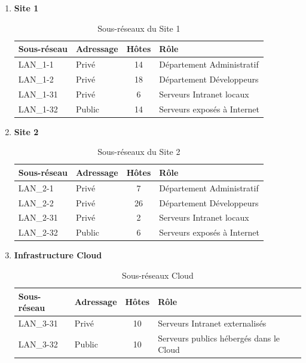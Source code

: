 \documentclass[12pt,a4paper, oneside]{memoir}
\begin{document}
\begin{enumerate}
	\item \textbf{Site 1}

\begin{table}[H]
	\centering
	\renewcommand{\arraystretch}{1.3}
	\begin{tabular}{|l|l|c|l|}
		\hline
		\textbf{Sous-réseau} & \textbf{Adressage} & \textbf{Hôtes} & \textbf{Rôle} \\
		\hline
		LAN\_1-1 & Privé & 14 & Département Administratif \\
		LAN\_1-2 & Privé & 18 & Département Développeurs \\
		LAN\_1-31 & Privé & 6 & Serveurs Intranet locaux \\
		LAN\_1-32 & Public & 14 & Serveurs exposés à Internet \\
		\hline
	\end{tabular}
	\caption{Sous-réseaux du Site 1}
\end{table}

	\item \textbf{Site 2}

\begin{table}[H]
	\centering
	\renewcommand{\arraystretch}{1.3}
	\begin{tabular}{|l|l|c|l|}
		\hline
		\textbf{Sous-réseau} & \textbf{Adressage} & \textbf{Hôtes} & \textbf{Rôle} \\
		\hline
		LAN\_2-1 & Privé & 7 & Département Administratif \\
		LAN\_2-2 & Privé & 26 & Département Développeurs \\
		LAN\_2-31 & Privé & 2 & Serveurs Intranet locaux \\
		LAN\_2-32 & Public & 6 & Serveurs exposés à Internet \\
		\hline
	\end{tabular}
	\caption{Sous-réseaux du Site 2}
\end{table}

	\item \textbf{Infrastructure Cloud}

\begin{table}[H]
	\centering
	\renewcommand{\arraystretch}{1.3}
	\begin{tabular}{|l|l|c|l|}
		\hline
		\textbf{Sous-réseau} & \textbf{Adressage} & \textbf{Hôtes} & \textbf{Rôle} \\
		\hline
		LAN\_3-31 & Privé & 10 & Serveurs Intranet externalisés \\
		LAN\_3-32 & Public & 10 & Serveurs publics hébergés dans le Cloud \\
		\hline
	\end{tabular}
	\caption{Sous-réseaux Cloud}
\end{table}
\end{enumerate}
\end{document}
